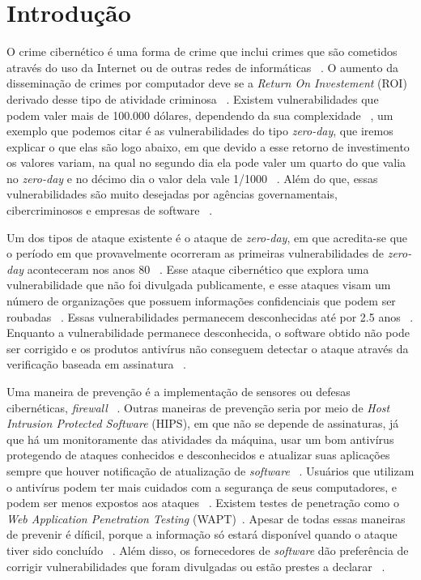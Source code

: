 \section{Introdução}
O crime cibernético é uma forma de crime que inclui crimes que são cometidos através do uso da Internet ou de outras redes de
informáticas ~\cite{Fotiet:2015}. O aumento da disseminação de crimes por computador deve se a \textit{Return On Investement}
(ROI) derivado desse tipo de atividade criminosa ~\cite{Fotiet:2015}. Existem vulnerabilidades que podem valer mais de 100.000 dólares, 
dependendo da sua complexidade ~\cite{Bilge:2012}, um exemplo que podemos citar é as vulnerabilidades do tipo \textit{zero-day}, que 
iremos explicar o que elas são logo abaixo, em que devido a esse retorno de investimento os valores variam, na qual no segundo dia ela 
pode valer um quarto do que valia no \textit{zero-day} e no décimo dia o valor dela vale 1/1000 ~\cite{Fotiet:2015}. Além do que, essas 
vulnerabilidades são muito desejadas por agências governamentais, cibercriminosos e empresas de software ~\cite{Kumar:2016}.

Um dos tipos de ataque existente é o ataque de \textit{zero-day}, em que acredita-se que o período em que provavelmente ocorreram as 
primeiras vulnerabilidades de \textit{zero-day} aconteceram nos anos 80 ~\cite{Fotiet:2015}. Esse ataque cibernético que explora uma 
vulnerabilidade que não foi divulgada publicamente, e esse ataques visam um número de organizações que possuem informações confidenciais 
que podem ser roubadas ~\cite{Bilge:2012}. Essas vulnerabilidades permanecem desconhecidas até por 2.5 anos ~\cite{Bilge:2012}. Enquanto 
a vulnerabilidade permanece desconhecida, o software obtido não pode ser corrigido e os produtos antivírus não conseguem detectar o 
ataque através da verificação baseada em assinatura ~\cite{Bilge:2012}. 

Uma maneira de prevenção é a implementação de sensores ou defesas cibernéticas, \textit{firewall} ~\cite{Last:2016}. Outras maneiras de 
prevenção seria por meio de \textit{Host Intrusion Protected Software} (HIPS), em que não se depende de assinaturas, já que há um 
monitoramente das atividades da máquina, usar um bom antivírus  protegendo de ataques conhecidos e desconhecidos e atualizar suas 
aplicações sempre que houver notificação de atualização de \textit{software} ~\cite{Kumar:2016}. Usuários que utilizam o antivírus podem 
ter mais cuidados com a segurança de seus computadores, e podem ser menos expostos aos ataques ~\cite{Bilge:2012}. Existem testes de 
penetração como o \textit{Web Application Penetration Testing} (WAPT)~\cite{Kumar:2016}. Apesar de todas essas maneiras de prevenir é 
díficil, porque a informação só estará disponível quando o ataque tiver sido concluído ~\cite{Kumar:2016}. Além disso, os fornecedores 
de \textit{software} dão preferência de corrigir vulnerabilidades que foram divulgadas ou estão prestes a declarar ~\cite{Bilge:2012}.

